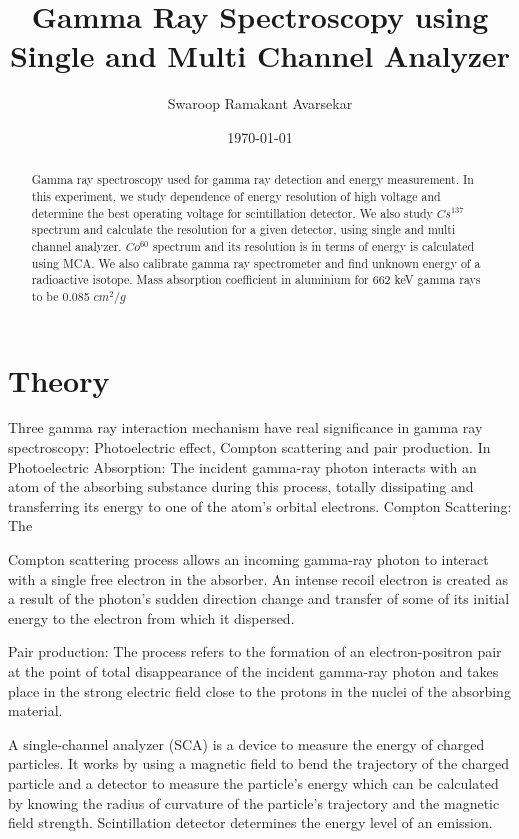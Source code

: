 \documentclass[a4paper, amsfonts, amssymb, amsmath, reprint, showkeys, nofootinbib, twoside]{revtex4-1}
\begin{document}
\title{Gamma Ray Spectroscopy using Single and Multi Channel Analyzer}
\author{Swaroop Ramakant Avarsekar}
\date{\today}

\begin{abstract}
Gamma ray spectroscopy used for gamma ray detection and energy measurement. In this experiment, we study dependence of energy resolution of high voltage and determine the best operating voltage for scintillation detector. We also study $Cs^{137}$ spectrum and calculate the resolution for a given detector, using single and multi channel analyzer. $Co^{60}$ spectrum and its resolution is in terms of energy is calculated using MCA. We also calibrate gamma ray spectrometer and find unknown energy of a radioactive isotope. Mass absorption coefficient in aluminium for 662 keV gamma rays to be 0.085 $cm^2/g$
\end{abstract}
	
\maketitle
\section{Theory}
Three gamma ray interaction mechanism have real significance in gamma ray spectroscopy: Photoelectric effect, Compton scattering and pair production. In Photoelectric Absorption: The incident gamma-ray photon interacts with an atom of the absorbing substance during this process, totally dissipating and transferring its energy to one of the atom’s orbital electrons. Compton Scattering: The 

Compton scattering process allows an incoming gamma-ray photon to interact with a single free electron in the absorber. An intense recoil electron is created as a result of the photon’s sudden direction change and transfer of some of its initial energy to the electron from which it dispersed.

Pair production: The process refers to the formation of an electron-positron pair at the point of total disappearance of the incident gamma-ray photon and takes place in the strong electric field close to the protons in the nuclei of the absorbing material.

A single-channel analyzer (SCA) is a device to measure the energy of charged particles. It works by using a magnetic field to bend the trajectory of the charged particle and a detector to measure the particle’s energy which can be calculated by knowing the radius of curvature of the particle’s trajectory and the magnetic field strength. Scintillation detector determines the energy level of an emission.
\end{document}
